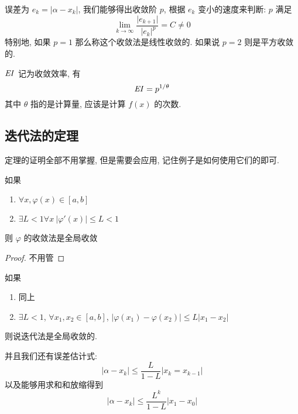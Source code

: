 \begin{frame}
		\begin{defi}[收敛速度]
		误差为 \(e _{k} =\vert \alpha - x_{k}\vert\), 我们能够得出收敛阶 \(p\), 根据 \(e _{k}\) 变小的速度来判断: \(p\) 满足
				\[
						\lim_{k\to \infty} \frac{\vert e_{k+1} \vert}{\ \vert e_{k} \vert ^{p}} = C \ne 0
				\]
		特别地, 如果 \(p = 1\) 那么称这个收敛法是线性收敛的. 如果说 \(p = 2\) 则是平方收敛的.
		\end{defi}
\begin{defi}[收敛效率]
		\(\it EI\) 记为收敛效率, 有
		\[
				{\it EI} = p ^{1/ \theta}
		\]
		其中 \(\theta\) 指的是计算量, 应该是计算 \(f (x)\) 的次数.
\end{defi}
\end{frame}

\subsection{迭代法的定理}
\begin{frame}
定理的证明全部不用掌握, 但是需要会应用, 记住例子是如何使用它们的即可.

\begin{thm}
		如果
		\begin{enumerate}
				\item \(\forall x, \varphi (x) \in [a ,b ]\)
				\item \(\exists L < 1\forall x\ \vert \varphi ' (x) \vert \le L < 1\)
		\end{enumerate}
		则 \( \varphi\) 的收敛法是全局收敛
\end{thm}
\begin{proof}
不用管
\end{proof}
\end{frame}

\begin{frame}
	\begin{thm}
		如果
		\begin{enumerate}
			\item 同上
			\item \(\exists L < 1\), \(\forall x _{1} , x_{2} \in [a , b]\), \( \vert \varphi (x_{1}) - \varphi(x_{2}) \vert \le L \vert x_{1} - x_{2} \vert\)
		\end{enumerate}
		则说迭代法是全局收敛的.
	\end{thm}
	并且我们还有误差估计式:
	\[
		\vert\alpha - x_{k}\vert \le \frac{L}{1 - L} \vert x_{k} = x_{k-1} \vert
	\]
	以及能够用求和和放缩得到
	\[
		\vert \alpha - x_{k} \vert \le \frac{L ^{k}}{1 - L} \vert x _{1} - x_{0} \vert
	\]
\end{frame}

